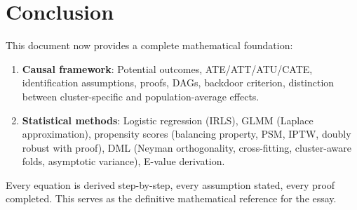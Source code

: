 \documentclass[12pt]{article}
\numberwithin{equation}{section}
\begin{document}
	\section{Conclusion}
	
	This document now provides a complete mathematical foundation:
	\begin{enumerate}
		\item \textbf{Causal framework}: Potential outcomes, ATE/ATT/ATU/CATE, identification assumptions, proofs, DAGs, backdoor criterion, distinction between cluster-specific and population-average effects.
		\item \textbf{Statistical methods}: Logistic regression (IRLS), GLMM (Laplace approximation), propensity scores (balancing property, PSM, IPTW, doubly robust with proof), DML (Neyman orthogonality, cross-fitting, cluster-aware folds, asymptotic variance), E-value derivation.
	\end{enumerate}
	
	Every equation is derived step-by-step, every assumption stated, every proof completed. This serves as the definitive mathematical reference for the essay.
	
\end{document}
